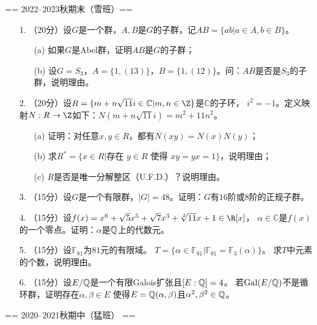 == 2022--2023秋期末（雪班）==
\begin{itemize}
\item[1.]（20分）设$G$是一个群，$A,B$是$G$的子群，记$AB=\{ab|a\in A,b\in B\}$。\\
\begin{itemize}
    \item[(a)]如果$G$是Abel群，证明$AB$是$G$的子群；
    \item[(b)]设$G=S_3$，$A=\{1,(13)\}$，$B=\{1,(12)\}$。问：$AB$是否是$S_3$的子群，说明理由。
\end{itemize}
\item[2.]（20分）设$R=\{m+n\sqrt{11}i\in\mathbb{C}|m,n\in\Z\}$是$\mathbb{C}$的子环，
$i^2=-1$。定义映射$N:R\to\Z$如下：$N(m+n\sqrt{11}i)=m^2+11n^2$。
\begin{itemize}
    \item[(a)]证明：对任意$x,y\in R$，都有$N(xy)=N(x)N(y)$；
    \item[(b)]求$R^*=\{x\in R|\text{存在 }y\in R\text{ 使得 }xy=yx=1\}$，说明理由；
    \item[(c)]$R$是否是唯一分解整区（U.F.D.）？说明理由。
\end{itemize}
\item[3.]（15分）设$G$是一个有限群，$|G|=48$。证明：$G$有$16$阶或$8$阶的正规子群。

\item[4.]（15分）设$f(x)=x^6+\sqrt{5}x^5+\sqrt{7}x^3+\sqrt[3]{11}x+1\in\R[x]$，
$\alpha\in\mathbb{C}$是$f(x)$的一个零点。证明：$\alpha$是$\mathbb{Q}$上的代数元。

\item[5.]（15分）设$\mathbb{F}_{81}$为$81$元的有限域。
$T=\{\alpha\in\mathbb{F}_{81}|\mathbb{F}_{81}=\mathbb{F}_3(\alpha)\}$。
求$T$中元素的个数，说明理由。

\item[6.]（15分）设$E/\mathbb{Q}$是一个有限Galois扩张且$[E:\mathbb{Q}]=4$。
若$\operatorname{Gal}(E/\mathbb{Q})$不是循环群，证明存在$\alpha,\beta\in E$
使得$E=\mathbb{Q}(\alpha,\beta)$且$\alpha^2,\beta^2\in\mathbb{Q}$。

\end{itemize}

== 2020--2021秋期中（猛班） ==

